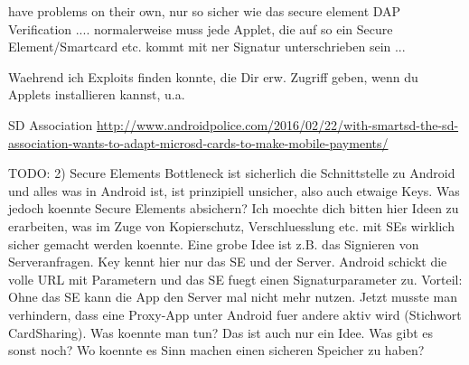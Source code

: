 have problems on their own, nur so sicher wie das secure element
DAP Verification .... normalerweise muss jede Applet, die auf so ein Secure Element/Smartcard etc. kommt mit ner Signatur unterschrieben sein ...


Waehrend ich Exploits finden konnte, die Dir erw. Zugriff geben, wenn du Applets installieren kannst, u.a.

SD Association
\url{http://www.androidpolice.com/2016/02/22/with-smartsd-the-sd-association-wants-to-adapt-microsd-cards-to-make-mobile-payments/}





TODO:
2) Secure Elements
Bottleneck ist sicherlich die Schnittstelle zu Android und alles was in Android ist, ist prinzipiell unsicher, also auch etwaige Keys. Was jedoch koennte Secure Elements absichern? Ich moechte dich bitten hier Ideen zu erarbeiten, was im Zuge von Kopierschutz,  Verschluesslung etc. mit SEs wirklich sicher gemacht werden koennte. Eine grobe Idee ist z.B. das Signieren von Serveranfragen. Key kennt hier nur das SE und der Server. Android schickt die volle URL mit Parametern und das SE fuegt einen Signaturparameter zu. Vorteil: Ohne das SE kann die App den Server mal nicht mehr nutzen. Jetzt musste man verhindern, dass eine Proxy-App unter Android fuer andere aktiv wird (Stichwort CardSharing). Was koennte man tun? Das ist auch nur ein Idee. Was gibt es sonst noch? Wo koennte es Sinn machen einen sicheren Speicher zu haben?
